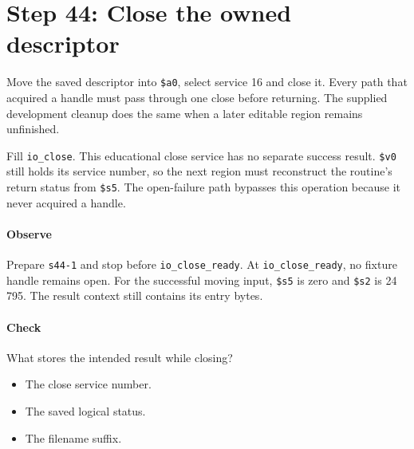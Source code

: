 \section{Step 44: Close the owned descriptor}
Move the saved descriptor into \texttt{\$a0}, select service 16 and close
it. Every path that acquired a handle must pass through one close before
returning. The supplied development cleanup does the same when a later editable
region remains unfinished.

Fill \texttt{io\_close}. This educational close service has no separate
success result. \texttt{\$v0} still holds its service number, so the next
region must reconstruct the routine's return status from \texttt{\$s5}.
The open-failure path bypasses this operation because it never acquired a handle.

\paragraph{Observe} Prepare \texttt{s44-1} and stop before
\texttt{io\_close\_ready}. At \texttt{io\_close\_ready}, no fixture handle remains open.
For the successful moving input, \texttt{\$s5} is zero and
\texttt{\$s2} is 24\,795. The result context still contains its entry bytes.

\paragraph{Check} What stores the intended result while closing?
\begin{itemize}
  \item[A.] The close service number.
  \item[B.] The saved logical status.
  \item[C.] The filename suffix.
\end{itemize}
